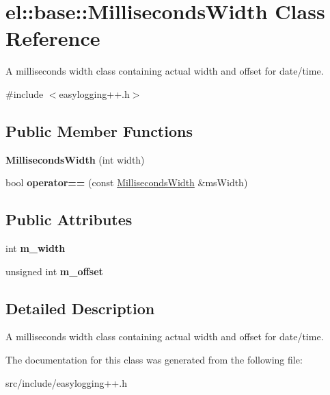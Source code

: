 \hypertarget{classel_1_1base_1_1_milliseconds_width}{}\section{el\+:\+:base\+:\+:Milliseconds\+Width Class Reference}
\label{classel_1_1base_1_1_milliseconds_width}


A milliseconds width class containing actual width and offset for date/time.  




{\ttfamily \#include $<$easylogging++.\+h$>$}

\subsection*{Public Member Functions}
\begin{DoxyCompactItemize}
\item 
\mbox{\label{classel_1_1base_1_1_milliseconds_width_a358fa0fcdd4076c4038ecdfc206de38a}} 
{\bfseries Milliseconds\+Width} (int width)
\item 
\mbox{\label{classel_1_1base_1_1_milliseconds_width_a60f5fb6e31216d1268585b98d20517ff}} 
bool {\bfseries operator==} (const \hyperlink{classel_1_1base_1_1_milliseconds_width}{Milliseconds\+Width} \&ms\+Width)
\end{DoxyCompactItemize}
\subsection*{Public Attributes}
\begin{DoxyCompactItemize}
\item 
\mbox{\label{classel_1_1base_1_1_milliseconds_width_a31c468b0323d376505c4975720c7b66e}} 
int {\bfseries m\+\_\+width}
\item 
\mbox{\label{classel_1_1base_1_1_milliseconds_width_a0e98edbecf602a915d4d609747c52669}} 
unsigned int {\bfseries m\+\_\+offset}
\end{DoxyCompactItemize}


\subsection{Detailed Description}
A milliseconds width class containing actual width and offset for date/time. 

The documentation for this class was generated from the following file\+:\begin{DoxyCompactItemize}
\item 
src/include/easylogging++.\+h\end{DoxyCompactItemize}
